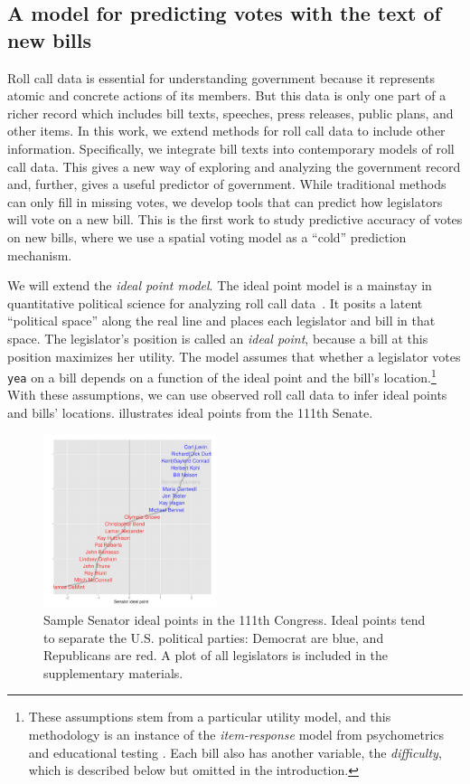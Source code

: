 \subsection{A model for predicting votes with the text of new bills}
Roll call data is essential for understanding government because it
represents atomic and concrete actions of its members.  But this data
is only one part of a richer record which includes bill texts,
speeches, press releases, public plans, and other items.  In this
work, we extend methods for roll call data to include other
information.  Specifically, we integrate bill texts into contemporary
models of roll call data.  This gives a new way of exploring and
analyzing the government record and, further, gives a useful predictor
of government.  While traditional methods can only fill in missing
votes, we develop tools that can predict how legislators will vote on
a new bill. This is the first work to study predictive accuracy of
votes on new bills, where we use a spatial voting model as a ``cold''
prediction mechanism.

We will extend the \textit{ideal point model}.  The ideal point model
is a mainstay in quantitative political science for analyzing roll
call data~\cite{clinton:2004}.  It posits a latent ``political space''
along the real line and places each legislator and bill in that
space. The legislator's position is called an \textit{ideal point},
because a bill at this position maximizes her utility.  The model
assumes that whether a legislator votes \verb!yea! on a bill depends
on a function of the ideal point and the bill's
location.\footnote{These assumptions stem from a particular utility
model, and this methodology is an instance of the
\textit{item-response} model from psychometrics and educational
testing \cite{lord:1980}.  Each bill also has another variable, the
\textit{difficulty}, which is described below but omitted in the
introduction.}  With these assumptions, we can use observed roll call
data to infer ideal points and bills' locations.  
illustrates ideal points from the 111th Senate.

\begin{figure}[t]
  \includegraphics[width=0.45\textwidth]
  {chapter_spatial_voting_with_text/figures/134_senator_name_accuracy_by_ip_sample.pdf}
  \caption{Sample Senator ideal points in the 111th Congress.  Ideal
    points tend to separate the U.S. political parties: Democrat are blue,
    and Republicans are red. A plot of all legislators is included in
    the supplementary materials.}
\label{fig:ideal_points}
\end{figure}

